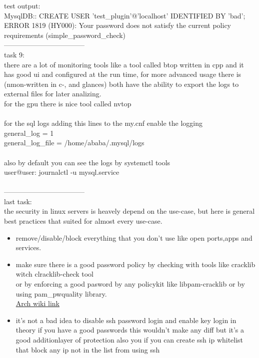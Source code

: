\documentclass[a4paper,14pt]{extarticle}
\begin{document}
{test output:\\
MysqlDB:: CREATE USER 'test\_plugin'@'localhost' IDENTIFIED BY 'bad';\\
ERROR 1819 (HY000): Your password does not satisfy the current policy requirements (simple\_password\_check)\\
-----------------------------------\\
task 9:\\
there are a lot of monitoring tools like a tool called btop written in cpp and it has good ui and configured at the run time, for more advanced usage there is (nmon-written in c-, and glances) both have the ability to export the logs to external files for later analizing.\\
for the gpu there is nice tool called nvtop \\
\\
for the sql logs adding this lines to the my.cnf enable the logging\\
general\_log = 1\\
general\_log\_file = /home/ababa/.mysql/logs\\
\\
also by default you can see the logs by systemctl tools\\
user@user: journalctl -u mysql.service\\
\\
\newpage
-----------------------------------\\
last task:\\
the security in linux servers is heavely depend on the use-case, but here is general best practices that suited for almost every use-case.\\
\begin{itemize}
  \item remove/disable/block everything that you don't use like open ports,apps and services.
  \item make sure there is a good password policy by checking with tools like cracklib witch clracklib-check tool\\
      or by enforcing a good pasword by any policykit like libpam-cracklib or by using pam\_pwquality library.\\
  \href{https://wiki.archlinux.org/title/Security#Enforcing\_strong\_passwords\_with\_pam\_pwquality}{Arch wiki link}\\
  \item it's not a bad idea to disable ssh password login and enable key login in theory if you have a good passwords this wouldn't make any diff but it's a good additionlayer of protection also you if you can create ssh ip whitelist that block any ip not in the list from using ssh\\

\end{itemize}}
\end{document}
